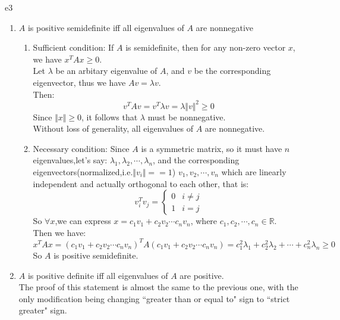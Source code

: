 \documentclass{article}
\begin{document}
\begin{PROOF}{e3}
	\begin{enumerate}
		\item $A$ is positive semidefinite iff all eigenvalues of $A$ are nonnegative
		\begin{enumerate}
			\item Sufficient condition:
			If $A$ is semidefinite, then for any non-zero vector $x$, we have $x^TAx\ge0$. \\
			Let $\lambda$ be an arbitary eigenvalue of $A$, and $v$ be the corresponding eigenvector, thus we have $Av=\lambda v$.\\
			Then:
			\begin{equation}
				v^TAv=v^T\lambda v=\lambda \Vert v\Vert^2 \ge 0
			\end{equation}
			Since $\Vert x\Vert \ge0$, it follows that $\lambda$ must be nonnegative.\\
			Without loss of generality, all eigenvalues of $A$ are nonnegative.
			\item Necessary condition:
			Since $A$ is a symmetric matrix, so it must have $n$ eigenvalues,let's say: $\lambda_1,\lambda_2,\cdots,\lambda_n$, and the corresponding eigenvectors(normalized,i.e.$\Vert v_i\Vert==1$) $v_1,v_2,\cdots,v_n$ which are linearly independent and actually orthogonal to each other, that is:
			\begin{equation}
				v_i^Tv_j=
				\begin{cases}
					0&i\neq j\\
					1&i=j
				\end{cases}
			\end{equation}
			So $\forall x$,we can express $x=c_1v_1+c_2v_2\cdots c_nv_n$, where $c_1,c_2,\cdots,c_n \in \mathbb{R}$. \\ Then we have:
			\begin{equation}
				x^TAx=(c_1v_1+c_2v_2\cdots c_nv_n)^TA(c_1v_1+c_2v_2\cdots c_nv_n)=c_1^2\lambda_1+c_2^2\lambda_2+\cdots+c_n^2\lambda_n \ge 0
			\end{equation}
			So $A$ is positive semidefinite.
		\end{enumerate}
		\item $A$ is positive definite iff all eigenvalues of $A$ are positive.\\
		The proof of this statement is almost the same to the previous one, with the only modification being changing ``greater than or equal to" sign to ``strict greater" sign.
	\end{enumerate}
\end{PROOF}
\end{document}
